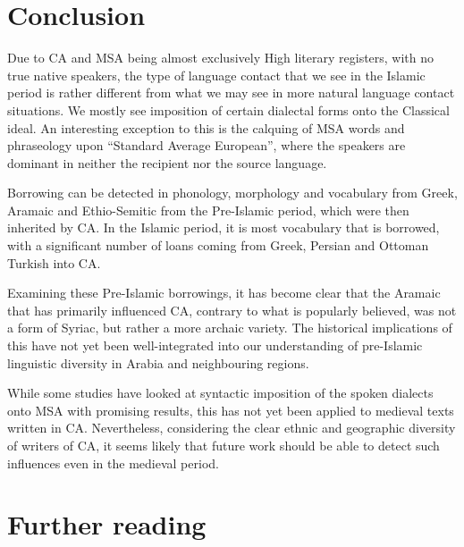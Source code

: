 \documentclass[output=paper]{langsci/langscibook}
\begin{document}
\section{Conclusion}

Due to CA and MSA being almost exclusively High literary registers, with no true native speakers, the type of language contact that we see in the Islamic period is rather different from what we may see in more natural language contact situations. We mostly see imposition of certain dialectal forms onto the Classical ideal. An interesting exception to this is the calquing of MSA words and phraseology upon “Standard Average European”, where the speakers are dominant in neither the recipient nor the source language.

Borrowing can be detected in phonology, morphology and vocabulary from Greek, Aramaic and Ethio-Semitic from the Pre-Islamic period, which were then inherited by CA. In the Islamic period, it is most vocabulary that is borrowed, with a significant number of loans coming from Greek, Persian and Ottoman Turkish into CA.

Examining these Pre-Islamic borrowings, it has become clear that the Aramaic that has primarily influenced CA, contrary to what is popularly believed, was not a form of Syriac, but rather a more archaic variety. The historical implications of this have not yet been well-integrated into our understanding of pre-Islamic linguistic diversity in Arabia and neighbouring regions.

While some studies have looked at syntactic imposition of the spoken dialects onto MSA with promising results, this has not yet been applied to medieval texts written in CA. Nevertheless, considering the clear ethnic and geographic diversity of writers of CA, it seems likely that future work should be able to detect such influences even in the medieval period.

\section*{Further reading}
\end{document}
